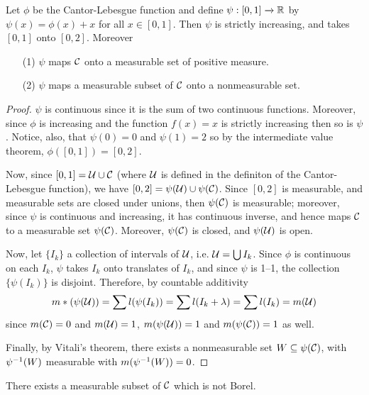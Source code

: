 \begin{lemma}\label{2.5.7}
    Let $\phi$ be the Cantor-Lebesgue function and define  $\psi:[0,1]
    \xrightarrow{} \mathbb{R}$ by $\psi(x)=\phi(x)+x$ for all $x \in [0,1]$. Then $\psi$
    is strictly increasing, and takes  $[0,1]$ onto $[0,2]$. Moreover
    \begin{enumerate}
        \item[(1)] $\psi$ maps  $\mathcal{C}$ onto a measurable set of positive measure.

        \item[(2)] $\psi$ maps a measurable subset of  $\mathcal{C}$ onto a nonmeasurable
            set.
    \end{enumerate}
\end{lemma}
\begin{proof}
    $\psi$ is continuous since it is the sum of two continuous functions.
    Moreover, since $\phi$ is increasing and the function  $f(x)=x$ is strictly
    increasing then so is $\psi$. Notice, also, that $\psi(0)=0$ and $\psi(1)=2$
    so by the intermediate value theorem, $\phi([0,1])=[0,2]$.

    Now, since $[0,1]=\mathcal{U} \cup \mathcal{C}$ (where $\mathcal{U}$ is defined in the definiton of the
    Cantor-Lebesgue function), we have $[0,2]=\psi(\mathcal{U}) \cup \psi(\mathcal{C})$. Since
    $[0,2]$ is measurable, and measurable sets are closed under unions, then
    $\psi(\mathcal{C})$ is measurable; moreover, since $\psi$ is continuous and
    increasing, it has continuous inverse, and hence maps $\mathcal{C}$ to a measurable
    set  $\psi(\mathcal{C})$. Moreover, $\psi(\mathcal{C})$ is closed, and $\psi(\mathcal{U})$ is open.

    Now, let $\{I_k\}$ a collection of intervals of $\mathcal{U}$, i.e.
    $\mathcal{U}=\bigcup{I_k}$. Since $\phi$ is continuous on each  $I_k$, $\psi$ takes
    $I_k$ onto translates of  $I_k$, and since  $\psi$ is  1--1, the collection
     $\{\psi(I_k)\}$ is disjoint. Therefore, by countable additivity
     \begin{equation*}
         m*(\psi(\mathcal{U}))=\sum{l(\psi(I_k))}=\sum{l(I_k+\lambda)}=\sum{l(I_k)}=m(\mathcal{U})
     \end{equation*}
     since $m(\mathcal{C})=0$ and $m(\mathcal{U})=1$, $m(\psi(\mathcal{U}))=1$ and $m(\psi(\mathcal{C}))=1$ as
     well.

     Finally, by Vitali's theorem, there exists a nonmeasurable set $W \subseteq
     \psi(\mathcal{C})$, with $\psi^{-1}(W)$ measurable with $m(\psi^{-1}(W))=0$.
\end{proof}

\begin{theorem}\label{2.5.8}
    There exists a measurable subset of $\mathcal{C}$ which is not Borel.
\end{theorem}
